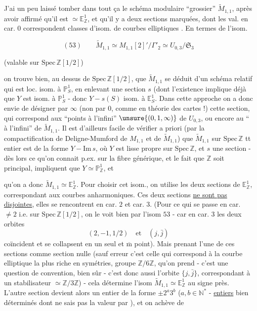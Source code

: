 J'ai un peu laissé tomber  dans tout
ça le schéma modulaire ``grossier'' $\widetilde M_{1,1}$,
après avoir affirmé qu'il est $\simeq\mathbb E_{\mathbb Z}^{1}$, et
qu'il y a deux sections marquées,
dont les  val. en car. $0$ correspondent
  classes d'isom. de courbes elliptiques
. En termes de l'isom.

\[
(53)\qquad
\widetilde M_{1,1}\simeq M_{1,1}[2]'/\Gamma'_2
\simeq U_{0,3}/\mathfrak S_3
\]

\qquad
(valable sur $\mathrm{Spec}\,\mathbb Z[1/2]$)

on trouve bien, au dessus de $\mathrm{Spec}\,\mathbb Z[1/2]$, que
$\widetilde M_{1,1}$ se déduit d'un schéma relatif  qui est
 loc.  isom. à $\mathbb P^1_S$,
en enlevant une section $s$ (dont l'existence implique déjà que $Y$ est
 isom. à $\mathbb P^1_S$ - donc
$Y-s(S)$ isom. à $\mathbb E^1_S$.
Dans cette approche on a donc envie de désigner par $\infty$
(non par $0$, comme en théorie des cartes !) cette section,
qui correspond aux ``points à l'infini'' $\unsure{(0,1,\infty)}$ de
$U_{0,3}$, ou encore au `` à l'infini'' de
$\widetilde M_{1,1}$.
Il est d'ailleurs facile de vérifier a priori 
(par la compactification de Deligne-Mumford de $M_{1,1}$ et de
$\widetilde M_{1,1}$) que $\widetilde M_{1,1}$ sur $\mathrm{Spec}\,\mathbb Z$
tt entier est de la forme $Y-\mathrm{Im}\,s$, où $Y$ est lisse propre
sur $\mathrm{Spec}\,\mathbb Z$, et $s$ une section - dès lors ce qu'on
connait p.ex. sur la fibre générique, et le fait que $\mathbb Z$ soit
principal, impliquent que $Y\simeq\mathbb P^1_{\mathbb Z}$, et

qu'on a donc $\widetilde M_{1,1}\simeq\mathbb E^1_{\mathbb Z}$.
Pour  choisir cet isom., on utilise les deux sections de
$\mathbb E^1_{\mathbb Z}$, correspondant aux courbes anharmoniques.
Ces deux sections \uline{ne sont pas} \uline{disjointes}, elles se
rencontrent en car. $2$ et car. $3$.
(Pour ce qui se passe en car. $\ne 2$ i.e. sur
$\mathrm{Spec}\,\mathbb Z[1/2]$, on le voit bien par l'isom $53$ -
 car en car. $3$ les deux orbites
\[
(2,-1,1/2)\quad\text{et}\quad(j,\bar j)
\]
coïncident et se collapsent en un seul et
$\overline{\mathrm m}$ point).
Mais prenant l'une de ces sections comme section nulle
(sauf erreur c'est celle qui correspond à la courbe elliptique la plus
riche en symétries,   groupe $\mathbb Z/6\mathbb Z$, qu'on prend -
c'est une question de convention, bien sûr - c'est donc aussi l'orbite
$\{j,\bar j\}$, correspondant à un stabilisateur
$\simeq\mathbb Z/3\mathbb Z$) - cela détermine l'isom
$\widetilde M_{1,1}\simeq\mathbb E^1_{\mathbb Z}$ au signe près.
L'autre section devient alors un entier de la forme
$\pm 2^a3^b$ ($a,b\in\mathbb N^*$ - \uline{entiers} bien déterminés dont
 ne sais pas la valeur par ), et on achève de

